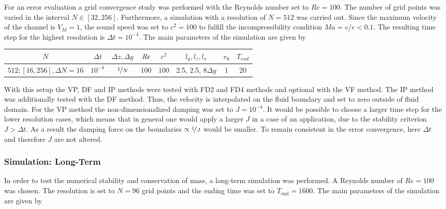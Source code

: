 For an error evaluation a grid convergence study was performed with the Reynolds number set to $Re=100$.
The number of grid points was varied in the interval $N\in[32, 256]$. Furthermore, a
simulation with a resolution of $N=512$ was carried out.
Since the maximum velocity of the channel is $V_{M}=1$,
the sound speed was set to $c^2 = 100$ to fulfill the incompressibility condition $Ma = v/c < 0.1$.
The resulting time step for the highest resolution is $\Delta t = 10^{-4}$.
The main parameters of the simulation are  given by

\begin{center}
\vspace*{0.7ex}
\begin{tabular}{c|c|c|c|c|c|c|c }
 $ N  $                   & $\Delta t$ & $\Delta z, \Delta y$            & $\mbox{\textit{Re}}$  & $c^2$   & $l_y, l_z, l_x$ & $r_0$ & $T_{end}$\\
\hline
 $512; [16, 256], \Delta N = 16 $& $10^{-4}$ & $\nicefrac{1}{N}$ & 100     & $100$   & 2.5, 2.5, $8\Delta y$ & 1     & 20\\
\end{tabular}
\vspace*{0.7ex}
\end{center}

With this setup the VP, DF and IP methods were tested with FD2 and FD4 methods and optional with the VF method.
The IP method was additionally tested with the DF method. Thus, the velocity is interpolated on the
fluid boundary and set to zero outside of fluid domain.
For the VP method the non-dimensionalized damping was set to $J=10^{-4}$.
It would be possible to choose a larger time step for the lower resolution cases, which means that in general
one would apply a larger $J$ in a case of an application, due to the stability criterion $J>\Delta t$.
As a result the damping force on the boundaries $\propto \nicefrac{1}{J}$ would be smaller.
To remain consistent in the error convergence, here $\Delta t$ and
therefore $J$ are not altered.

\subsubsection{Simulation: Long-Term}

In order to test the  numerical stability and conservation of mass, a long-term simulation was performed.
A Reynolds number of $Re=100$ was chosen. The resolution is set to $N=96$ grid points and
the ending time was set to $T_{\text{end}}=1600$.
The main parameters of the simulation are  given by

